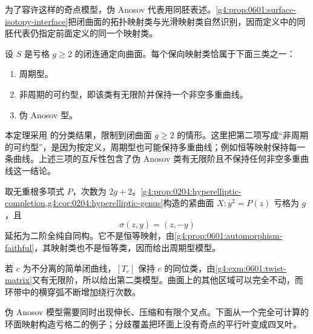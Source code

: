 \ProseParagraphBreak

为了容许这样的奇点模型，伪 Anosov 代表用同胚表述。\cref{g4:prop:0601:surface-isotopy-interface}把闭曲面的拓扑映射类与光滑映射类自然识别，因而定义中的同胚代表仍指定前面定义的同一个映射类。

\begin{theorem}\label{g4:thm:0601:nielsen-thurston}
	设 \(S\) 是亏格 \(g\ge2\) 的闭连通定向曲面。每个保向映射类恰属于下面三类之一：
	\begin{enumerate}
		\item 周期型。
		\item 非周期的可约型，即该类有无限阶并保持一个非空多重曲线。
		\item 伪 Anosov 型。
	\end{enumerate}
\end{theorem}

本定理采用 \cite[第13.3节，第376页，定理13.2]{FarbMargalit2012Primer} 的分类结果，限制到闭曲面 \(g\ge2\) 的情形。这里把第二项写成“非周期的可约型”，是因为按定义，周期型也可能保持多重曲线；例如恒等映射保持每一条曲线。上述三项的互斥性包含了伪 Anosov 类有无限阶且不保持任何非空多重曲线这一结论。

\begin{example}\label{g4:exm:0601:periodic-reducible-models}
	取无重根多项式 \(P\)，次数为 \(2g+2\)。\cref{g4:prop:0204:hyperelliptic-completion,g4:cor:0204:hyperelliptic-genus}构造的紧曲面 \(X:y^2=P(z)\) 亏格为 \(g\)，且
	\[
		\sigma(z,y)=(z,-y)
	\]
	延拓为二阶全纯自同构。它不是恒等映射，由\cref{g4:prop:0601:automorphism-faithful}，其映射类也不是恒等类，因而给出周期型模型。

	若 \(c\) 为不分离的简单闭曲线，\([T_c]\) 保持 \(c\) 的同位类，由\cref{g4:exm:0601:twist-matrix}又有无限阶，所以给出第二类模型。曲面上的其他区域可以完全不动，而环带中的横穿弧不断增加绕行次数。
\end{example}

伪 Anosov 模型需要同时出现伸长、压缩和有限个叉点。下面从一个完全可计算的环面映射构造亏格二的例子；分歧覆盖把环面上没有奇点的平行叶变成四叉叶。

